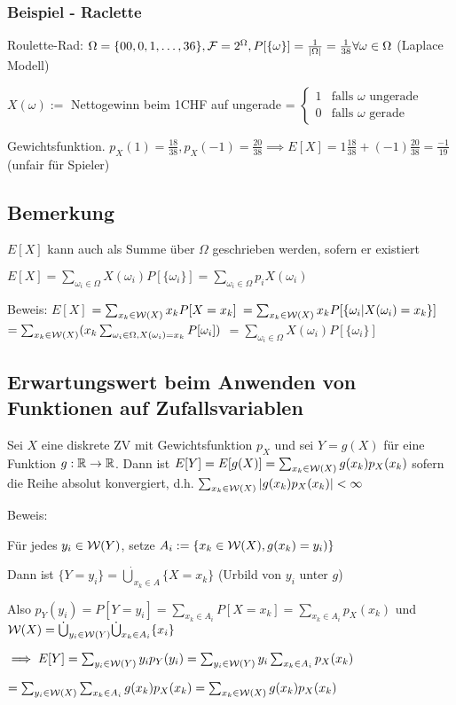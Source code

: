 \subsubsection{Beispiel - Raclette}
\enumstart
	\item Roulette-Rad: $\Omega = \{00,0,1,\mathellipsis, 36\}, \mathcal{F} = 2^\Omega, P[\{\omega\}] = \frac{1}{|\Omega|} = \frac{1}{38} \forall \omega \in \Omega$ (Laplace Modell)
	\item $X(\omega) := $ Nettogewinn beim 1CHF auf ungerade = $\begin{cases}1 &\text{falls $\omega$ ungerade}\\0 &\text{falls $\omega$ gerade}\end{cases}$
	\item Gewichtsfunktion. $p_X(1) = \frac{18}{38}, p_X(-1) = \frac{20}{38} \implies E[X] = 1\frac{18}{38}+(-1)\frac{20}{38} = \frac{-1}{19}$ (unfair für Spieler)
\enumend

\subsection{Bemerkung}
\enumstart
	\item $E[X]$ kann auch als Summe über $\Omega$ geschrieben werden, sofern er existiert
	\item $E[X] = \sum_{\omega_i \in \Omega}X(\omega_i)P[\{\omega_i\}] = \sum_{\omega_i \in \Omega}p_iX(\omega_i)$
	\item Beweis: $E[X] $
		$= \sum_{x_k \in \mathcal{W}(X)}x_kP[X = x_k]$
		$= \sum_{x_k \in \mathcal{W}(X)}x_kP[\{\omega_i | X(\omega_i) = x_k\}]$
		$= \sum_{x_k \in \mathcal{W}(X)}(x_k \sum_{\omega_i \in \Omega, X(\omega_i)= x_k}P[\omega_i]) $
		$= \sum_{\omega_i \in \Omega}X(\omega_i)P[\{\omega_i\}]$
\enumend

\subsection{Erwartungswert beim Anwenden von Funktionen auf Zufallsvariablen}
\enumstart
	\item Sei $X$ eine diskrete ZV mit Gewichtsfunktion $p_X$ und sei $Y = g(X)$ für eine Funktion $g: \mathbb{R} \rightarrow \mathbb{R}$. Dann ist $E[Y] = E[g(X)] = \sum_{x_k \in \mathcal{W}(X)}g(x_k)p_X(x_k)$ sofern die Reihe absolut konvergiert, d.h. $\sum_{x_k \in \mathcal{W}(X)}|g(x_k)p_X(x_k)| < \infty$
	\item Beweis:
	\enumstart
		\item Für jedes $y_i \in \mathcal{W}(Y)$, setze $A_i := \{x_k \in \mathcal{W}(X), g(x_k) = y_i)\}$
		\item Dann ist $\{Y = y_i\} = \dot\bigcup_{x_k \in A}\{X = x_k\}$ (Urbild von $y_i$ unter $g$)
		\item Also $p_Y(y_i) = P[Y = y_i] = \sum_{x_k \in A_i}P[X = x_k] = \sum_{x_k \in A_i}p_X(x_k)$ und $\mathcal{W}(X) = \dot\bigcup_{y_i \in \mathcal{W}(Y)}\dot\bigcup_{x_k \in A_i}\{x_i\}$
		\item $\implies E[Y] = \sum_{y_i \in \mathcal{W}(Y)}y_ip_Y(y_i) = \sum_{y_i \in \mathcal{W}(Y)}y_i\sum_{x_k \in A_i}p_X(x_k)$
		\item $= \sum_{y_i \in \mathcal{W}(X)}\sum_{x_k \in A_i}g(x_k)p_X(x_k) = \sum_{x_k \in \mathcal{W}(X)}g(x_k)p_X(x_k)$
	\enumend
\enumend
